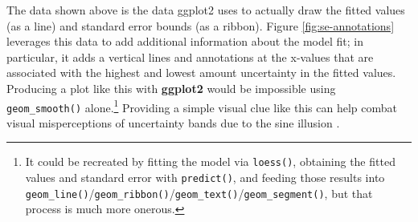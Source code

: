 \documentclass[
  12pt,
]{krantz}
\newenvironment{Shaded}{\begin{snugshade}}{\end{snugshade}}
\newcommand{\CommentTok}[1]{\textcolor[rgb]{0.56,0.35,0.01}{\textit{#1}}}
\newcommand{\DataTypeTok}[1]{\textcolor[rgb]{0.13,0.29,0.53}{#1}}
\newcommand{\DecValTok}[1]{\textcolor[rgb]{0.00,0.00,0.81}{#1}}
\newcommand{\KeywordTok}[1]{\textcolor[rgb]{0.13,0.29,0.53}{\textbf{#1}}}
\newcommand{\NormalTok}[1]{#1}
\newcommand{\OperatorTok}[1]{\textcolor[rgb]{0.81,0.36,0.00}{\textbf{#1}}}
\newcommand{\OtherTok}[1]{\textcolor[rgb]{0.56,0.35,0.01}{#1}}
\newcommand{\StringTok}[1]{\textcolor[rgb]{0.31,0.60,0.02}{#1}}
\begin{document}
\begin{Shaded}
\end{Shaded}

The data shown above is the data ggplot2 uses to actually draw the fitted values (as a line) and standard error bounds (as a ribbon). Figure \ref{fig:se-annotations} leverages this data to add additional information about the model fit; in particular, it adds a vertical lines and annotations at the x-values that are associated with the highest and lowest amount uncertainty in the fitted values. Producing a plot like this with \textbf{ggplot2} would be impossible using \texttt{geom\_smooth()} alone.\footnote{It could be recreated by fitting the model via \texttt{loess()}, obtaining the fitted values and standard error with \texttt{predict()}, and feeding those results into \texttt{geom\_line()}/\texttt{geom\_ribbon()}/\texttt{geom\_text()}/\texttt{geom\_segment()}, but that process is much more onerous.} Providing a simple visual clue like this can help combat visual misperceptions of uncertainty bands due to the sine illusion \citep{sine-illusion}.
\end{document}
